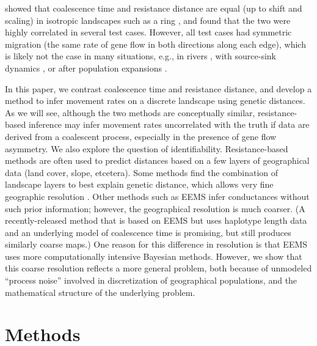 \documentclass{article}
\begin{document}
\citet{mcrae2006isolation} showed that coalescence time and resistance distance are equal
(up to shift and scaling) in isotropic landscapes such as a ring \citep{matsen2006convergence},
and found that the two were highly correlated in several test cases.
However, all test cases had symmetric migration
(the same rate of gene flow in both directions along each edge),
which is likely not the case in many situations, e.g.,
in rivers \citep{morrissey2009maintenance,sundqvist2016directional,hanks2017modeling},
with source-sink dynamics \citep{dias1996sources},
or after population expansions \citep{with2002landscape}.

In this paper, we contrast 
coalescence time and resistance distance,
and develop a method to infer movement rates on a discrete landscape
using genetic distances.
As we will see,
although the two methods are conceptually similar,
resistance-based inference may infer movement rates uncorrelated with the truth 
if data are derived from a coalescent process,
especially in the presence of gene flow asymmetry. 
We also explore the question of identifiability.
Resistance-based methods are often used to predict distances based on a few layers of geographical data
(land cover, slope, etcetera).
Some methods find the combination of landscape layers to best explain genetic distance,
which allows very fine geographic resolution \citep{shaffer2017desert}.
Other methods such as EEMS \citep[``Estimating Effective Migration Surfaces'',][]{petkova2016visualizing} infer conductances without such prior information; 
however, the geographical resolution is much coarser.
(A recently-released method 
that is based on EEMS but uses haplotype length data and an underlying model of coalescence time
\citep{alasadi2018estimating}
is promising, but still produces similarly coarse maps.)
One reason for this difference in resolution
is that EEMS uses more computationally intensive Bayesian methods.
However, we show that this coarse resolution reflects a more general problem, 
both because of unmodeled ``process noise'' involved in discretization of geographical populations,
and the mathematical structure of the underlying problem.


\section*{Methods}
\end{document}
